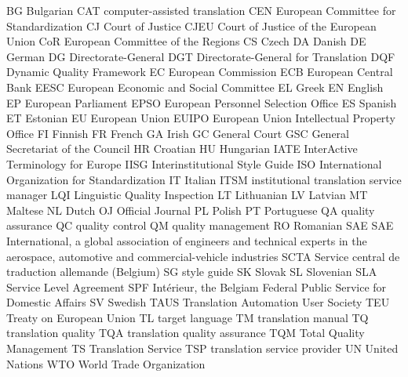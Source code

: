 \begin{refsection}
BG
Bulgarian
CAT
computer-assisted translation
CEN
European Committee for Standardization
CJ
Court of Justice
CJEU
Court of Justice of the European Union
CoR
European Committee of the Regions
CS
Czech
DA
Danish
DE
German
DG
Directorate-General
DGT
Directorate-General for Translation
DQF
Dynamic Quality Framework
EC
European Commission
ECB
European Central Bank
EESC
European Economic and Social Committee
EL
Greek
EN
English
EP
European Parliament
EPSO
European Personnel Selection Office
ES
Spanish
ET
Estonian
EU
European Union
EUIPO
European Union Intellectual Property Office
FI
Finnish
FR
French
GA
Irish
GC
General Court
GSC
General Secretariat of the Council
HR
Croatian
HU
Hungarian
IATE
InterActive Terminology for Europe
IISG
Interinstitutional Style Guide
ISO
International Organization for Standardization
IT
Italian
ITSM
institutional translation service manager
LQI
Linguistic Quality Inspection
LT
Lithuanian
LV
Latvian
MT
Maltese
NL
Dutch
OJ
Official Journal
PL
Polish
PT
Portuguese
QA
quality assurance
QC
quality control
QM
quality management
RO
Romanian
SAE
SAE International, a global association of engineers and technical experts in the aerospace, automotive and commercial-vehicle industries
SCTA
Service central de traduction allemande (Belgium)
SG
style guide
SK
Slovak
SL
Slovenian
SLA
Service Level Agreement
SPF
Intérieur, the Belgiam Federal Public Service for Domestic Affairs
SV
Swedish
TAUS
Translation Automation User Society
TEU
Treaty on European Union
TL
target language
TM
translation manual
TQ
translation quality
TQA
translation quality assurance
TQM
Total Quality Management
TS
Translation Service
TSP
translation service provider
UN
United Nations
WTO
World Trade Organization


\printbibliography[heading=subbibliography]
\end{refsection}

